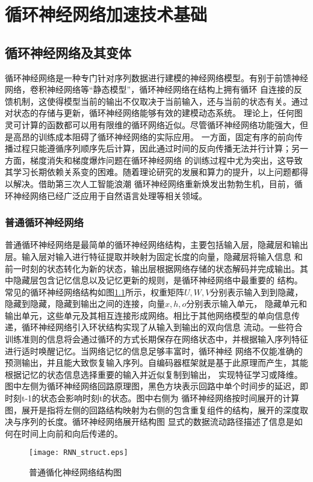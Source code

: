 \chapter{循环神经网络加速技术基础}

\section{循环神经网络及其变体}
循环神经网络是一种专门针对序列数据进行建模的神经网络模型。有别于前馈神经网络，卷积神经网络等“静态模型”，循环神经网络在结构上拥有循环
自连接的反馈机制，这使得模型当前的输出不仅取决于当前输入，还与当前的状态有关。通过对状态的存储与更新，循环神经网络能够有效的建模动态系统。
理论上，任何图灵可计算的函数都可以用有限维的循环网络近似。尽管循环神经网络功能强大，但是高昂的训练成本阻碍了循环神经网络的实际应用。
一方面，固定有序的前向传播过程只能遵循序列顺序先后计算，因此通过时间的反向传播无法并行计算；另一方面，梯度消失和梯度爆炸问题在循环神经网络
的训练过程中尤为突出，这导致其学习长期依赖关系变的困难。随着理论研究的发展和算力的提升，以上问题都得以解决。借助第三次人工智能浪潮
循环神经网络重新焕发出勃勃生机，目前，循环神经网络已经广泛应用于自然语言处理等相关领域。

\subsection{普通循环神经网络}
普通循环神经网络是最简单的循环神经网络结构，主要包括输入层，隐藏层和输出层。输入层对输入进行特征提取并映射为固定长度的向量，隐藏层将输入信息
和前一时刻的状态转化为新的状态，输出层根据网络存储的状态解码并完成输出。其中隐藏层包含记忆信息以及记忆更新的规则，是循环神经网络中最重要的
结构。
常见的循环神经网络结构如图\ref{fig:rnn}所示，权重矩阵\(U, W, V\)分别表示输入到到隐藏，隐藏到隐藏，隐藏到输出之间的连接，向量\(x, h, o\)分别表示输入单元，
隐藏单元和输出单元，这些单元及其相互连接形成网络。相比于其他网络模型的单向信息传递，循环神经网络引入环状结构实现了从输入到输出的双向信息
流动。一些符合训练准则的信息将会通过循环的方式长期保存在网络状态中，并根据输入序列特征进行适时唤醒记忆。当网络记忆的信息足够丰富时，循环神经
网络不仅能准确的预测输出，并且能大致恢复输入序列。自编码器框架就是基于此原理而产生，其能根据记忆的状态信息选择重要的输入并近似复制到输出，
实现特征学习或降维。图中左侧为循环神经网络回路原理图，黑色方块表示回路中单个时间步的延迟，即时刻t-1的状态会影响时刻t的状态。图中右侧为
循环神经网络按时间展开的计算图，展开是指将左侧的回路结构映射为右侧的包含重复组件的结构，展开的深度取决与序列的长度。循环神经网络展开结构图
显式的数据流动路径描述了信息是如何在时间上向前和向后传递的。
\begin{figure}
	\centering
	\texttt{[image: RNN\_struct.eps]}
	\caption{普通循化神经网络结构图}
	\label{fig:rnn}
\end{figure}

